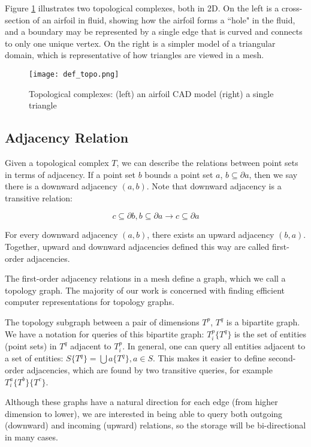 Figure \ref{fig:def_topo} illustrates two topological
complexes, both in 2D.
On the left is a cross-section of an airfoil in fluid,
showing how the airfoil forms a ``hole" in the fluid,
and a boundary may be represented by a single edge
that is curved and connects to only one unique vertex.
On the right is a simpler model of a triangular domain,
which is representative of how triangles are viewed
in a mesh.

\begin{figure}
\begin{center}
\texttt{[image: def\_topo.png]}
\caption{Topological complexes: (left) an airfoil CAD model (right)
a single triangle}
\label{fig:def_topo}
\end{center}
\end{figure}

\subsection{Adjacency Relation}
\label{sec:def_adj}

Given a topological complex $T$, we can describe the relations between
point sets in terms of adjacency.
If a point set $b$ bounds a point set $a$,
$b \subseteq \partial a$, then we say there is a
downward adjacency $(a,b)$.
Note that downward adjacency is a transitive relation:

\[c \subseteq \partial b, b \subseteq \partial a \to c \subseteq \partial a\]

For every downward adjacency $(a,b)$, there exists an upward
adjacency $(b,a)$.
Together, upward and downward adjacencies defined this way
are called first-order adjacencies.

The first-order adjacency relations in a mesh define a graph,
which we call a topology graph.
The majority of our work is concerned with finding
efficient computer representations for topology graphs.

The topology subgraph between a pair of dimensions $T^p$, $T^q$
is a bipartite graph.
We have a notation for queries of this bipartite graph:
$T^p_i\{T^q\}$ is the set of entities (point sets) in $T^q$ adjacent to
$T^p_i$.
In general, one can query all entities adjacent
to a set of entities: $S\{T^q\} = \bigcup a \{T^q\}, a \in S$.
This makes it easier to define second-order adjacencies,
which are found by two transitive queries,
for example $T^a_i\{T^b\}\{T^c\}$.

Although these graphs have a natural direction for each
edge (from higher dimension to lower), we are interested
in being able to query both outgoing (downward) and
incoming (upward) relations, so the storage will be
bi-directional in many cases.

